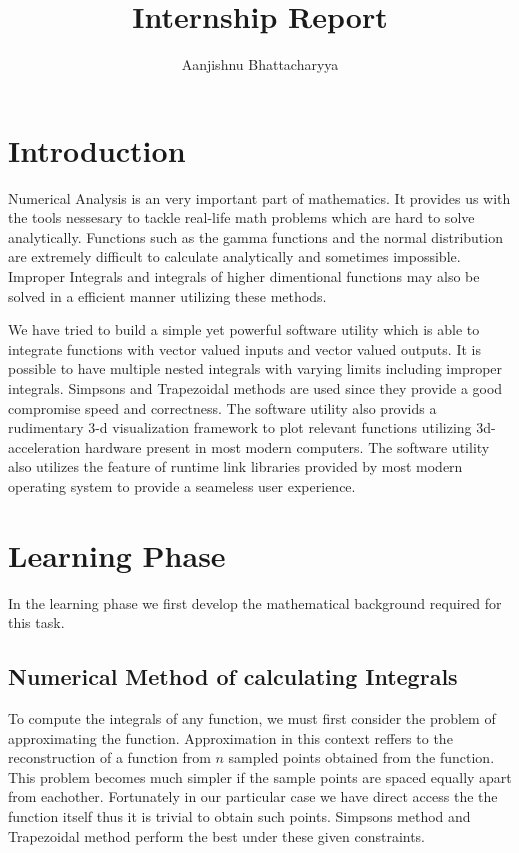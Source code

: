 \documentclass[12pt]{article}
\title{Internship Report}
\author{Aanjishnu Bhattacharyya}
\begin{document}
\maketitle
\tableofcontents
\newpage

\section{Introduction}

Numerical Analysis is an very important part of mathematics. It provides us with the tools nessesary to tackle
real-life math problems which are hard to solve analytically. Functions such as the gamma functions and the normal
distribution are extremely difficult to calculate analytically and sometimes impossible. Improper Integrals and
integrals of higher dimentional functions may also be solved in a efficient manner utilizing these methods.

We have tried to build a simple yet powerful software utility which is able to integrate functions with vector valued
inputs and vector valued outputs. It is possible to have multiple nested integrals with varying limits including improper
integrals. Simpsons and Trapezoidal methods are used since they provide a good compromise speed and correctness.
The software utility also provids a rudimentary 3-d visualization framework to plot relevant functions utilizing 3d-acceleration 
hardware present in most modern computers. The software utility also utilizes the feature of runtime link libraries
provided by most modern operating system to provide a seameless user experience.

\section{Learning Phase}

In the learning phase we first develop the mathematical background required for this task.

\subsection{Numerical Method of calculating Integrals}

To compute the integrals of any function, we must first consider the problem of approximating the function.
Approximation in this context reffers to the reconstruction of a function from $n$ sampled points obtained
from the function. This problem becomes much simpler if the sample points are spaced equally apart from eachother.
Fortunately in our particular case we have direct access the the function itself thus it is trivial to obtain such
points. Simpsons method and Trapezoidal method perform the best under these given constraints.
\break
\break
\end{document}
